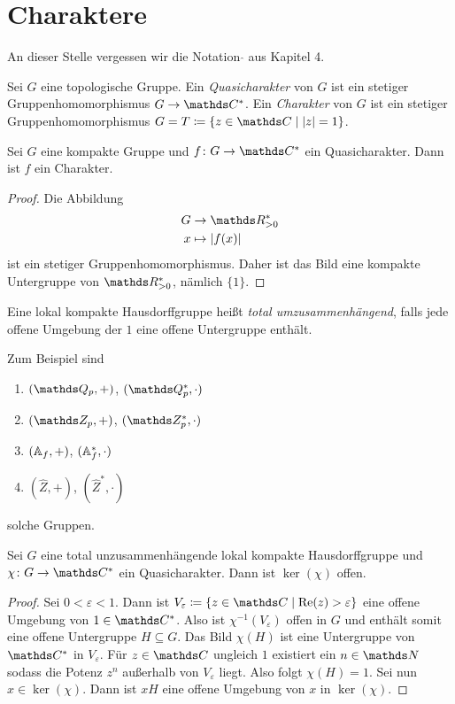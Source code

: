 \chapter{Charaktere}
An dieser Stelle vergessen wir die Notation $\hat{}$ aus Kapitel 4.
\begin{defi}
Sei $G$ eine topologische Gruppe.
Ein \emph{Quasicharakter} von $G$ ist ein stetiger Gruppenhomomorphismus $G \to \C^\ast$.
Ein \emph{Charakter} von $G$ ist ein stetiger Gruppenhomomorphismus $G=T\coloneqq \{z \in \C \mid \abs{z}=1\}$.
\end{defi}

\begin{prop}
Sei $G$ eine kompakte Gruppe und $f \colon G \to \C^\ast$ ein Quasicharakter.
Dann ist $f$ ein Charakter.
\end{prop}
\begin{proof}
Die Abbildung
\begin{align*}
G &\to \R_{>0}^\ast\\
x&\mapsto \abs{f(x)}
\end{align*}
ist ein stetiger Gruppenhomomorphismus. Daher ist das Bild eine kompakte Untergruppe von $\R_{>0}^\ast$, nämlich $\{1\}$.
\end{proof}

\begin{defi}
Eine lokal kompakte Hausdorffgruppe heißt \emph{total umzusammenhängend}, falls jede offene Umgebung der $1$ eine offene Untergruppe enthält.
\end{defi}

\begin{bsp}
Zum Beispiel sind
\begin{enumerate}[label=\roman*)]
\item $(\Q_p,+)$, $(\Q_p^\ast,\cdot)$
\item $(\Z_p,+)$, $(\Z_p^\ast,\cdot)$
\item $(\mathbb{A}_f,+)$, $(\mathbb{A}_f^\ast,\cdot)$
\item $(\hat{Z},+)$, $(\hat{Z}^\ast,\cdot)$
\end{enumerate}
solche Gruppen.
\end{bsp}

\begin{prop}
Sei $G$ eine total unzusammenhängende lokal kompakte Hausdorffgruppe und $\chi\colon G \to \C^\ast$ ein Quasicharakter.
Dann ist $\ker(\chi)$ offen.
\end{prop}
\begin{proof}
Sei $0<\varepsilon<1$. Dann ist $V_\varepsilon\coloneqq \{z\in \C \mid \Ret(z)>\varepsilon\}$ eine offene Umgebung von $1\in \C^\ast$.
Also ist $\chi^{-1}(V_\varepsilon)$ offen in $G$ und enthält somit eine offene Untergruppe $H \subseteq G$.
Das Bild $\chi(H)$ ist eine Untergruppe von $\C^\ast$ in $V_\varepsilon$.
Für $z\in \C$ ungleich $1$ existiert ein $n\in \N$ sodass die Potenz $z^n$ außerhalb von $V_\varepsilon$ liegt.
Also folgt $\chi(H)=1$.
Sei nun $x\in \ker(\chi)$. Dann ist $xH$ eine offene Umgebung von $x$ in $\ker(\chi)$.
\end{proof}

